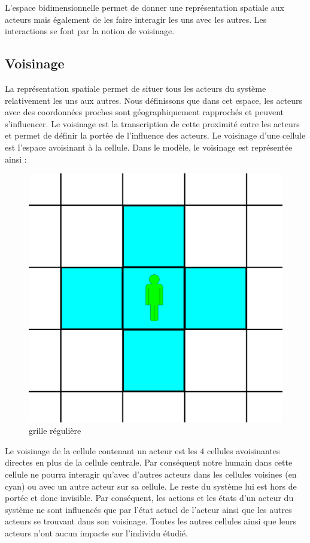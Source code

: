 L'espace bidimensionnelle permet de donner une représentation spatiale aux acteurs mais également de les faire interagir les uns avec les autres. Les interactions se font par la notion de voisinage. 

\newpage

\subsection{Voisinage}

La représentation spatiale permet de situer tous les acteurs du système relativement les uns aux autres. Nous définissons que dans cet espace, les acteurs avec des coordonnées proches sont géographiquement rapprochés et peuvent s'influencer. Le voisinage est la transcription de cette proximité entre les acteurs et permet de définir la portée de l'influence des acteurs. Le voisinage d'une cellule est l'espace avoisinant à la cellule. Dans le modèle, le voisinage est représentée ainsi :\\

\begin{figure}[h]
\centering
\captionsetup{justification=centering}
\includegraphics[scale=0.5]{Images/voisinage.png}
\caption{grille régulière}
\end{figure}

Le voisinage de la cellule contenant un acteur est les $4$ cellules avoisinantes directes en plus de la cellule centrale. Par conséquent notre humain dans cette cellule ne pourra interagir qu'avec d'autres acteurs dans les cellules voisines (en cyan) ou avec un autre acteur sur sa cellule. Le reste du système lui est hors de portée et donc invisible. Par conséquent, les actions et les états d'un acteur du système ne sont influencés que par l'état actuel de l'acteur ainsi que les autres acteurs se trouvant dans son voisinage. Toutes les autres cellules ainsi que leurs acteurs n'ont aucun impacte sur l'individu étudié.

